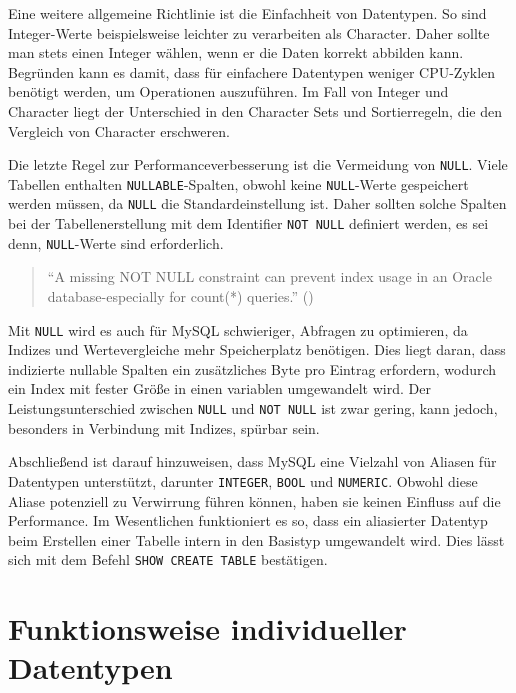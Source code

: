 Eine weitere allgemeine Richtlinie ist die Einfachheit von Datentypen.
So sind Integer-Werte beispielsweise leichter zu verarbeiten als Character.
Daher sollte man stets einen Integer wählen, wenn er die Daten korrekt abbilden kann.
Begründen kann es damit, dass für einfachere Datentypen weniger CPU-Zyklen benötigt werden, um Operationen auszuführen.
Im Fall von Integer und Character liegt der Unterschied in den Character Sets und Sortierregeln, die den Vergleich von Character erschweren.

Die letzte Regel zur Performanceverbesserung ist die Vermeidung von \texttt{NULL}.
Viele Tabellen enthalten \texttt{NULLABLE}-Spalten, obwohl keine \texttt{NULL}-Werte gespeichert werden müssen, da \texttt{NULL} die Standardeinstellung ist.
Daher sollten solche Spalten bei der Tabellenerstellung mit dem Identifier \texttt{NOT NULL} definiert werden, es sei denn, \texttt{NULL}-Werte sind erforderlich.

\begin{quote}
    \enquote{A missing NOT NULL constraint can prevent index usage in an Oracle database-especially for count(*) queries.} (\cite[S. 57]{winand2011sql})
\end{quote}

Mit \texttt{NULL} wird es auch für MySQL schwieriger, Abfragen zu optimieren, da Indizes und Wertevergleiche mehr Speicherplatz benötigen.
Dies liegt daran, dass indizierte nullable Spalten ein zusätzliches Byte pro Eintrag erfordern, wodurch ein Index mit fester Größe in einen variablen umgewandelt wird.
Der Leistungsunterschied zwischen \texttt{NULL} und \texttt{NOT NULL} ist zwar gering, kann jedoch, besonders in Verbindung mit Indizes, spürbar sein.

Abschließend ist darauf hinzuweisen, dass MySQL eine Vielzahl von Aliasen für Datentypen unterstützt, darunter \texttt{INTEGER}, \texttt{BOOL} und \texttt{NUMERIC}.
Obwohl diese Aliase potenziell zu Verwirrung führen können, haben sie keinen Einfluss auf die Performance.
Im Wesentlichen funktioniert es so, dass ein aliasierter Datentyp beim Erstellen einer Tabelle intern in den Basistyp umgewandelt wird.
Dies lässt sich mit dem Befehl \texttt{SHOW CREATE TABLE} bestätigen.

\section{Funktionsweise individueller Datentypen}\label{sec:data-types-verhaltensweise-einzelner-datentypen}

